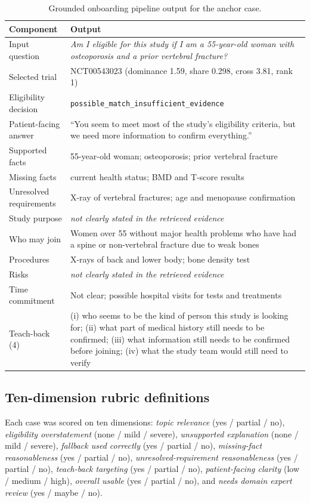 \documentclass[11pt]{article}
\newcommand{\fallback}{\textit{not clearly stated in the retrieved evidence}}
\begin{document}
\begin{table}[!htbp]
\centering
\caption{Grounded onboarding pipeline output for the anchor case.}
\label{tab:pipeline_example}
\small
\begin{tabularx}{\linewidth}{l X}
\toprule
Component & Output \\
\midrule
Input question & \textit{Am I eligible for this study if I am a 55-year-old woman with osteoporosis and a prior vertebral fracture?} \\
Selected trial & NCT00543023 (dominance 1.59, share 0.298, cross 3.81, rank 1) \\
Eligibility decision & \texttt{possible\_match\_insufficient\_evidence} \\
Patient-facing answer & ``You seem to meet most of the study's eligibility criteria, but we need more information to confirm everything.'' \\
Supported facts & 55-year-old woman; osteoporosis; prior vertebral fracture \\
Missing facts & current health status; BMD and T-score results \\
Unresolved requirements & X-ray of vertebral fractures; age and menopause confirmation \\
Study purpose & \fallback \\
Who may join & Women over 55 without major health problems who have had a spine or non-vertebral fracture due to weak bones \\
Procedures & X-rays of back and lower body; bone density test \\
Risks & \fallback \\
Time commitment & Not clear; possible hospital visits for tests and treatments \\
Teach-back (4) & (i) who seems to be the kind of person this study is looking for; (ii) what part of medical history still needs to be confirmed; (iii) what information still needs to be confirmed before joining; (iv) what the study team would still need to verify \\
\bottomrule
\end{tabularx}
\end{table}

\subsection{Ten-dimension rubric definitions}
\label{sup:rubric}
Each case was scored on ten dimensions: \emph{topic relevance} (yes / partial / no), \emph{eligibility overstatement} (none / mild / severe), \emph{unsupported explanation} (none / mild / severe), \emph{fallback used correctly} (yes / partial / no), \emph{missing-fact reasonableness} (yes / partial / no), \emph{unresolved-requirement reasonableness} (yes / partial / no), \emph{teach-back targeting} (yes / partial / no), \emph{patient-facing clarity} (low / medium / high), \emph{overall usable} (yes / partial / no), and \emph{needs domain expert review} (yes / maybe / no).
\end{document}
